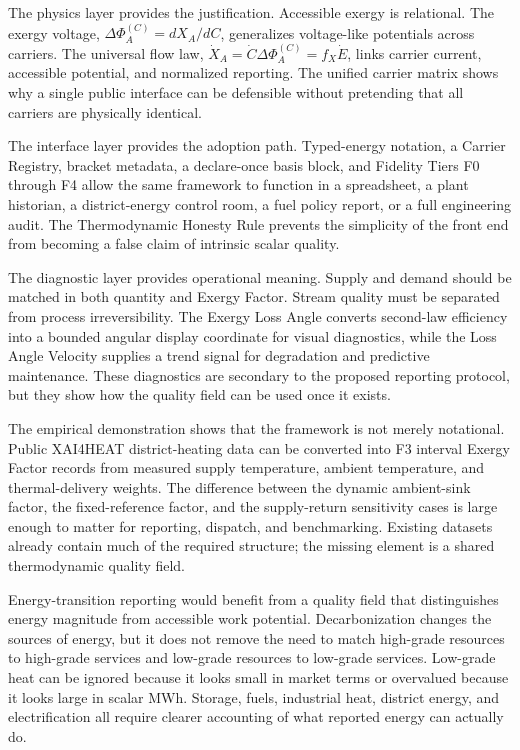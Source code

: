 \documentclass[11pt]{article}
\newcommand{\fx}{f_X}
\newcommand{\XdotA}{\dot{X}_A}
\begin{document}
The physics layer provides the justification. Accessible exergy is relational. The exergy voltage, $\Delta\Phi_A^{(C)}=dX_A/dC$, generalizes voltage-like potentials across carriers. The universal flow law, $\XdotA=\dot{C}\Delta\Phi_A^{(C)}=\fx\dot{E}$, links carrier current, accessible potential, and normalized reporting. The unified carrier matrix shows why a single public interface can be defensible without pretending that all carriers are physically identical.

The interface layer provides the adoption path. Typed-energy notation, a Carrier Registry, bracket metadata, a declare-once basis block, and Fidelity Tiers F0 through F4 allow the same framework to function in a spreadsheet, a plant historian, a district-energy control room, a fuel policy report, or a full engineering audit. The Thermodynamic Honesty Rule prevents the simplicity of the front end from becoming a false claim of intrinsic scalar quality.

The diagnostic layer provides operational meaning. Supply and demand should be matched in both quantity and Exergy Factor. Stream quality must be separated from process irreversibility. The Exergy Loss Angle converts second-law efficiency into a bounded angular display coordinate for visual diagnostics, while the Loss Angle Velocity supplies a trend signal for degradation and predictive maintenance. These diagnostics are secondary to the proposed reporting protocol, but they show how the quality field can be used once it exists.

The empirical demonstration shows that the framework is not merely notational. Public XAI4HEAT district-heating data can be converted into F3 interval Exergy Factor records from measured supply temperature, ambient temperature, and thermal-delivery weights. The difference between the dynamic ambient-sink factor, the fixed-reference factor, and the supply-return sensitivity cases is large enough to matter for reporting, dispatch, and benchmarking. Existing datasets already contain much of the required structure; the missing element is a shared thermodynamic quality field.

Energy-transition reporting would benefit from a quality field that distinguishes energy magnitude from accessible work potential. Decarbonization changes the sources of energy, but it does not remove the need to match high-grade resources to high-grade services and low-grade resources to low-grade services. Low-grade heat can be ignored because it looks small in market terms or overvalued because it looks large in scalar MWh. Storage, fuels, industrial heat, district energy, and electrification all require clearer accounting of what reported energy can actually do.
\end{document}
